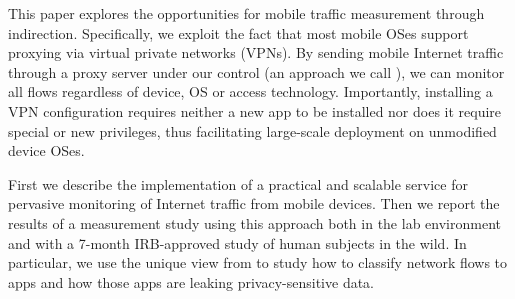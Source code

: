 This paper explores the opportunities for mobile traffic measurement through indirection. 
Specifically, we exploit the fact that most mobile OSes support proxying via virtual private networks (VPNs). 
By sending mobile Internet traffic through a proxy server under our control (an approach we call \platname), we can monitor all flows regardless of device, OS or access technology. 
Importantly, installing a VPN configuration requires neither a new app to be installed nor does it require special or new privileges, thus facilitating large-scale deployment on unmodified device OSes.

First we describe the implementation of a practical and scalable service for pervasive monitoring of 
Internet traffic from mobile devices.
Then we report the results of  a measurement study using this approach both in the lab environment and with a 7-month IRB-approved study of human subjects in the wild. In particular, we use the unique view from \platname to study how to classify network flows to apps and how those apps are leaking privacy-sensitive data.

